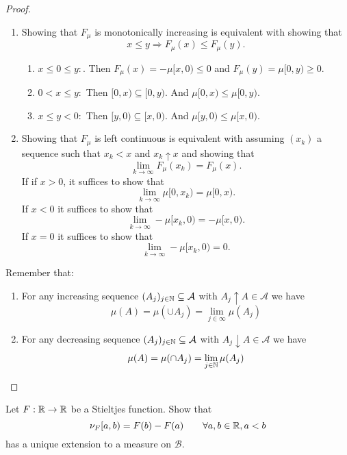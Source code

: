 \begin{proof}

\begin{enumerate}
  \item Showing that \(F_\mu \) is monotonically increasing is equivalent with showing that
\[
x\leq y \Longrightarrow  F_\mu (x)\leq F_\mu (y).
\]

\begin{enumerate}
  \item $x\leq 0\leq y:$. Then \(F_\mu (x)=-\mu [x,0)\leq 0\) and \(F_\mu (y)=\mu [0,y)\geq 0\).
  \item \(0<x\leq y:\) Then \([0,x)\subseteq [0,y)\). And \(\mu [0,x)\leq \mu [0,y)\).
  \item \(x\leq y<0:\) Then \([y,0)\subseteq [x,0).\) And \(\mu [y,0)\leq \mu [x,0)\).
\end{enumerate}
  \item Showing that \(F_\mu \) is left continuous is equivalent with assuming $(x_{k})$ a sequence such that \(x_{k}<x\) and \(x_{k}\uparrow x\) and showing that
\[
\lim_{k\rightarrow \infty }F_\mu (x_{k})=F_\mu (x).
\]
If if $x>0$, it suffices to show that
\[
\lim_{k\rightarrow \infty }\mu [0,x_{k})=\mu [0,x).
\]
If \(x<0\) it suffices to show that
\[
\lim_{k\rightarrow \infty }-\mu [x_{k},0)=-\mu [x,0).
\]
If \(x=0\) it suffices to show that
\[
\lim_{k\rightarrow \infty }-\mu [x_{k},0)=0.
\]
\end{enumerate}

Remember that:

\begin{enumerate}
  \item For any increasing sequence \((A_{j})_{j\in \Bbb{N}}\subseteq \mathcal{A}\) with \(A_{j}\uparrow A\in \mathcal{A}\) we have
\[
\mu (A)=\mu (\cup A_{j})=\lim_{j\in \infty }\mu (A_{j})
\]
  \item For any decreasing sequence \((A_{j})_{j\in \Bbb{N}}\subseteq \mathcal{A}\) with \(A_{j}\downarrow A\in \mathcal{A}\) we have
\[
\mu (A)=\mu (\cap A_{j})=\lim_{j\in \Bbb{N}}\mu (A_{j})
\]
\end{enumerate}
\end{proof}

\begin{thm}[Problem 7.9ii]
Let \(F:\Bbb{R}\rightarrow \Bbb{R}\) be a Stieltjes function. Show that
\[
\nu _F[a,b)=F(b)-F(a) \qquad \forall a,b\in \Bbb{R},a<b
\]
has a unique extension to a measure on \(\mathcal{B}\).
\end{thm}

